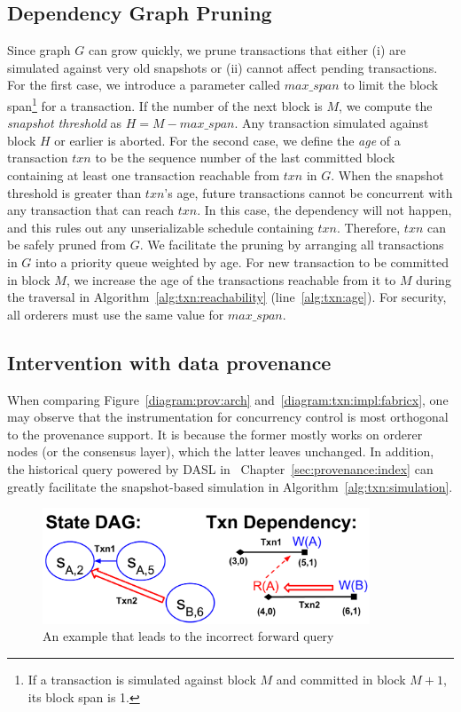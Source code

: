 \subsection{Dependency Graph Pruning}
\label{sec:txn:impl:optimization}
Since graph $G$ can grow quickly, we prune transactions that either (i) are simulated against very old snapshots or (ii) cannot affect pending transactions.
%
For the first case, we introduce a parameter called $max\_span$ to limit the block span\footnote{If a transaction is simulated against block $M$ and committed in block $M+1$, its block span is 1.} for
a transaction.
%
If the number of the next block is $M$, we compute the \textit{snapshot
  threshold} as $H = M - max\_span$.
%
Any transaction simulated against block $H$ or earlier is aborted.
%
For the second case, we define the \textit{age} of a transaction $txn$ to be the sequence
number of the last committed block containing at least one transaction reachable
from $txn$ in $G$.
%
When the snapshot threshold is greater than $txn$'s age, future transactions
cannot be concurrent with any transaction that can reach $txn$.
%
In this case, the  dependency will not happen, and this rules
out any unserializable schedule containing $txn$.
%
Therefore, $txn$ can be safely pruned from $G$.
%
We facilitate the pruning by arranging all transactions in $G$ into a priority
queue weighted by age.
%
For new transaction to be committed in block $M$, we increase the age of the
transactions reachable from it to $M$ during the traversal in
Algorithm~\ref{alg:txn:reachability} (line~\ref{alg:txn:age}).
%
For security, all orderers must use the same value for $max\_span$.

\subsection{Intervention with data provenance}
\label{sec:txn:impl:intervention}
When comparing Figure~\ref{diagram:prov:arch} and~\ref{diagram:txn:impl:fabricx}, one may observe that the instrumentation for concurrency control is most orthogonal to the provenance support. 
It is because the former mostly works on orderer nodes (or the consensus layer), which the latter leaves unchanged. 
In addition, the historical query powered by DASL in ~Chapter~\ref{sec:provenance:index} can greatly facilitate the snapshot-based simulation in Algorithm~\ref{alg:txn:simulation}. 

\begin{figure}
  \centering
	\includegraphics[width=0.87\textwidth]{diagram/txn/odd.pdf}
  \caption{An example that leads to the incorrect forward query}
	\label{diagram:txn:impl:sharp}
\end{figure}

